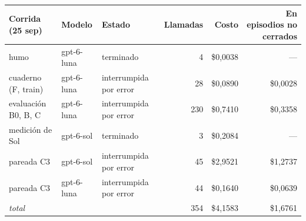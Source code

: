 \begin{tabular}{@{}lllrrr@{}}
\toprule
Corrida (25 sep) & Modelo & Estado & Llamadas & Costo & En episodios no cerrados\\
\midrule
humo & gpt-6-luna & terminado & 4 & \$0{,}0038 & ---\\
cuaderno (F, train) & gpt-6-luna & interrumpida por error & 28 & \$0{,}0890 & \$0{,}0028\\
evaluación B0, B, C & gpt-6-luna & interrumpida por error & 230 & \$0{,}7410 & \$0{,}3358\\
medición de Sol & gpt-6-sol & terminado & 3 & \$0{,}2084 & ---\\
pareada C3 & gpt-6-sol & interrumpida por error & 45 & \$2{,}9521 & \$1{,}2737\\
pareada C3 & gpt-6-luna & interrumpida por error & 44 & \$0{,}1640 & \$0{,}0639\\
\midrule
\textit{total} & & & 354 & \$4{,}1583 & \$1{,}6761\\
\bottomrule
\end{tabular}
